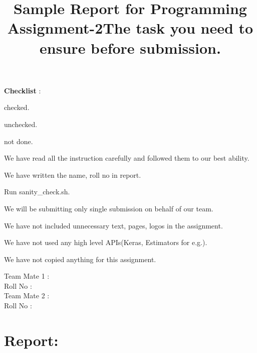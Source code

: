 \documentclass{article}
\title{Sample Report for Programming Assignment-2}
\newcommand{\cmark}{\ding{51}}%
\newcommand{\xmark}{\ding{55}}%
\newcommand{\done}{\rlap{$\square$}{\raisebox{2pt}{\large\hspace{1pt}\cmark}}%
\hspace{-2.5pt}}
\newcommand{\wontfix}{\rlap{$\square$}{\large\hspace{1pt}\xmark}}
\begin{document}
\maketitle
\textbf{Checklist} :
\begin{todolist}
\item[\done] checked.
\item unchecked.
\item[\wontfix] not done.
\end{todolist}
\title{\textbf{The task you need to ensure before submission.}}
\begin{todolist}
\item We have read all the instruction carefully and followed them to our best ability.
\item We have written the name, roll no in report.
\item Run sanity\_check.sh.
\item We will be submitting only single submission on behalf of our team.
\item We have not included unnecessary text, pages, logos in the assignment. 
\item We have not used any high level APIs(Keras, Estimators for e.g.).
\item We have not copied anything for this assignment.
\end{todolist}

\noindent Team Mate 1 : \\
Roll No : \\
Team Mate 2 : \\ %
Roll No : \\ %
\section*{Report:}
\end{document}
